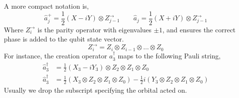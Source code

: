 A more compact notation is,
\begin{equation*}
    \hat a_j^+ = \frac{1}{2} (X - iY) \otimes Z^\rightarrow_{j-1} \qquad
    \hat a_j = \frac{1}{2} (X + iY) \otimes Z^\rightarrow_{j-1}
\end{equation*}
Where $Z^\rightarrow_{i}$ is the parity operator with eigenvalues $\pm 1$, and ensures the correct phase is added to the qubit state vector.
\begin{equation*}
    Z^\rightarrow_{i} = Z_i \otimes Z_{i-1} \otimes \dots \otimes Z_0
\end{equation*}
For instance, the creation operator $a^\dagger_3$ maps to the following Pauli string,
\begin{align*}
    \hat a_3^\dagger &=
    \frac{1}{2} (X_3 - iY_3) \otimes Z_2 \otimes Z_1 \otimes Z_0 \\
    \hat a_3^\dagger &=
    \frac{1}{2} ( X_3 \otimes Z_2 \otimes Z_1 \otimes Z_0 ) -
    \frac{1}{2} i ( Y_3 \otimes Z_2 \otimes Z_1 \otimes Z_0 )
\end{align*}
Usually we drop the subscript specifying the orbital acted on.
